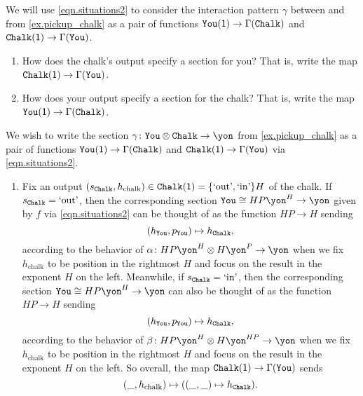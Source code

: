 \documentclass[Book-Poly]{subfiles}
\begin{document}
\begin{exercise}
We will use \eqref{eqn.situations2} to consider the interaction pattern $\gamma$ between  and  from \cref{ex.pickup_chalk} as a pair of functions $\texttt{You}(\textsf{1})\to\Gamma(\texttt{Chalk})$ and $\texttt{Chalk}(\textsf{1})\to\Gamma(\texttt{You})$.
\begin{enumerate}
	\item How does the chalk's output specify a section for you? That is, write the map $\texttt{Chalk}(\textsf{1})\to\Gamma(\texttt{You})$.
	\item How does your output specify a section for the chalk? That is, write the map $\texttt{You}(\textsf{1})\to\Gamma(\texttt{Chalk})$.
\qedhere
\end{enumerate}
\begin{solution}
We wish to write the section $\gamma\colon\const{You}\otimes\const{Chalk}\to\yon$ from \cref{ex.pickup_chalk} as a pair of functions $\texttt{You}(\textsf{1})\to\Gamma(\texttt{Chalk})$ and $\texttt{Chalk}(\textsf{1})\to\Gamma(\texttt{You})$ via \eqref{eqn.situations2}.
\begin{enumerate}
    \item Fix an output $(s_{\texttt{Chalk}}, h_\text{chalk})\in\texttt{Chalk}(\textsf{1})=\{\text{`out'},\text{`in'}\}H$ of the chalk.
    If $s_{\texttt{Chalk}}=\text{`out'}$, then the corresponding section $\const{You}\iso HP\yon^H\to\yon$ given by $f$ via \eqref{eqn.situations2} can be thought of as the function $HP\to H$ sending
    \[
        (h_{\texttt{You}},p_{\texttt{You}})\mapsto h_{\texttt{Chalk}},
    \]
    according to the behavior of $\alpha\colon HP\yon^H\otimes H\yon^P\to\yon$ when we fix $h_\text{chalk}$ to be position in the rightmost $H$ and focus on the result in the exponent $H$ on the left.
    Meanwhile, if $s_{\texttt{Chalk}}=\text{`in'}$, then the corresponding section $\const{You}\iso HP\yon^H\to\yon$ can also be thought of as the function $HP\to H$ sending
    \[
        (h_{\texttt{You}},p_{\texttt{You}})\mapsto h_{\texttt{Chalk}},
    \]
    according to the behavior of $\beta\colon HP\yon^H\otimes H\yon^{HP}\to\yon$ when we fix $h_\text{chalk}$ to be position in the rightmost $H$ and focus on the result in the exponent $H$ on the left.
    So overall, the map $\texttt{Chalk}(\textsf{1})\to\Gamma(\texttt{You})$ sends
    \[
        (\_,h_\text{chalk})\mapsto((\_,\_)\mapsto h_{\texttt{Chalk}}).
    \]


\end{enumerate}
\end{solution}
\end{exercise}
\end{document}
